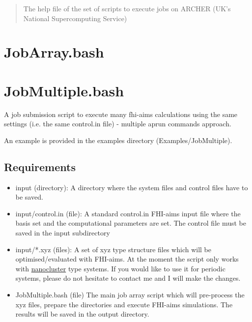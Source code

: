 \documentclass[12pt]{article}
\begin{document}
\maketitle

\begin{abstract}
The help file of the set of scripts to execute jobs on ARCHER (UK's National Supercomputing Service)
\end{abstract}

\section{JobArray.bash}

\section{JobMultiple.bash}

A job submission script to execute many fhi-aims calculations using the same settings (i.e. the same control.in file) - multiple aprun commands approach.

An example is provided in the examples directory (Examples/JobMultiple).

\subsection{Requirements}

\begin{itemize}

  \item input (directory):
  A directory where the system files and control files have to be saved.
  
  \item input/control.in (file):
  A standard control.in FHI-aims input file where the basis set and the computational parameters are set. The control file must be saved in the input subdirectory
  
  \item input/*.xyz (files):
  A set of xyz type structure files which will be optimised/evaluated with FHI-aims. At the moment the script only works with \underline{nanocluster} type systems. If you would like to use it for periodic systems, please do not hesitate to contact me and I will make the changes.
  
  \item JobMultiple.bash (file)
  The main job array script which will pre-process the xyz files, prepare the directories and execute FHI-aims simulations. The results will be saved in the output directory. 
   
\end{itemize}
\end{document}
